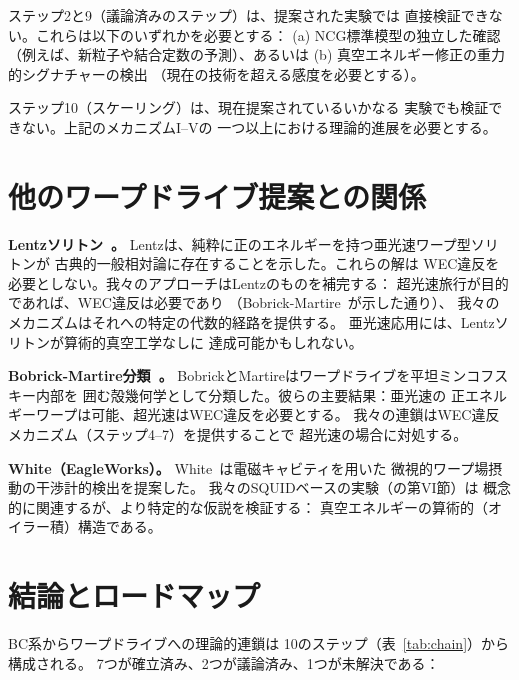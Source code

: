 \documentclass[11pt,a4paper]{article}
\begin{document}
ステップ2と9（議論済みのステップ）は、提案された実験では
直接検証できない。これらは以下のいずれかを必要とする：
(a) NCG標準模型の独立した確認
（例えば、新粒子や結合定数の予測）、あるいは
(b) 真空エネルギー修正の重力的シグナチャーの検出
（現在の技術を超える感度を必要とする）。

ステップ10（スケーリング）は、現在提案されているいかなる
実験でも検証できない。上記のメカニズムI--Vの
一つ以上における理論的進展を必要とする。

\section{他のワープドライブ提案との関係}
\label{sec:related}

\textbf{Lentzソリトン~\cite{Lentz2021}。}
Lentzは、純粋に正のエネルギーを持つ亜光速ワープ型ソリトンが
古典的一般相対論に存在することを示した。これらの解は
WEC違反を必要としない。我々のアプローチはLentzのものを補完する：
超光速旅行が目的であれば、WEC違反は必要であり
（Bobrick-Martire~\cite{BobrickMartire2021}が示した通り）、
我々のメカニズムはそれへの特定の代数的経路を提供する。
亜光速応用には、Lentzソリトンが算術的真空工学なしに
達成可能かもしれない。

\textbf{Bobrick-Martire分類~\cite{BobrickMartire2021}。}
BobrickとMartireはワープドライブを平坦ミンコフスキー内部を
囲む殻幾何学として分類した。彼らの主要結果：亜光速の
正エネルギーワープは可能、超光速はWEC違反を必要とする。
我々の連鎖はWEC違反メカニズム（ステップ4--7）を提供することで
超光速の場合に対処する。

\textbf{White（EagleWorks）。}
White~\cite{White2013}は電磁キャビティを用いた
微視的ワープ場摂動の干渉計的検出を提案した。
我々のSQUIDベースの実験（\cite{paper_A}の第VI節）は
概念的に関連するが、より特定的な仮説を検証する：
真空エネルギーの算術的（オイラー積）構造である。

\section{結論とロードマップ}
\label{sec:conclusion}

BC系からワープドライブへの理論的連鎖は
10のステップ（表~\ref{tab:chain}）から構成される。
7つが確立済み、2つが議論済み、1つが未解決である：
\end{document}

